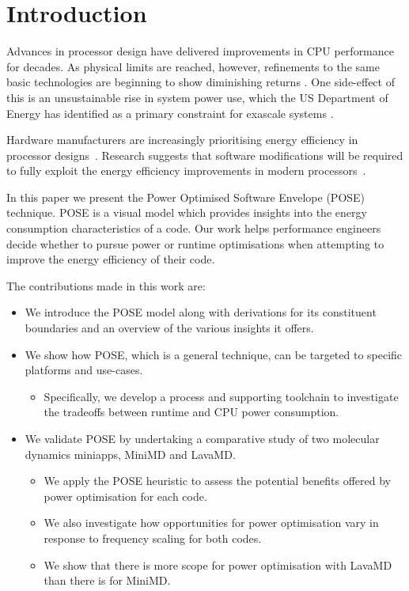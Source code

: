 \section{Introduction}
Advances in processor design have delivered improvements in CPU performance for decades. As physical limits are reached, however, refinements to the same basic technologies are beginning to show diminishing returns \cite{esmaeilzadeh:2011aa}. One side-effect of this is an unsustainable rise in system power use, which the US Department of Energy has identified as a primary constraint for exascale systems \cite{shalf:2011aa}.

Hardware manufacturers are increasingly prioritising energy efficiency in processor designs~\cite{kurd:2014aa}. 
Research suggests that software modifications will be required to fully exploit the energy efficiency improvements in modern processors~\cite{shao:2013aa}.

In this paper we present the Power Optimised Software Envelope (POSE) technique.
POSE is a visual model which provides insights into the energy consumption characteristics of a code.
Our work helps performance engineers decide whether to pursue power or runtime optimisations when attempting to improve the energy efficiency of their code.

\medskip \noindent
The contributions made in this work are:
\begin{itemize}
  \item We introduce the POSE model along with derivations for its constituent boundaries and an overview of the various insights it offers.
  \item We show how POSE, which is a general technique, can be targeted to specific platforms and use-cases. 
  \begin{itemize}
    \item Specifically, we develop a process and supporting toolchain to investigate the tradeoffs between runtime and CPU power consumption.
  \end{itemize}
  \item We validate POSE by undertaking a comparative study of two molecular dynamics miniapps, MiniMD and LavaMD.
  \begin{itemize}
    \item We apply the POSE heuristic to assess the potential benefits offered by power optimisation for each code.
    \item We also investigate how opportunities for power optimisation vary in response to frequency scaling for both codes.
    \item We show that there is more scope for power optimisation with LavaMD than there is for MiniMD.
  \end{itemize}
\end{itemize}

